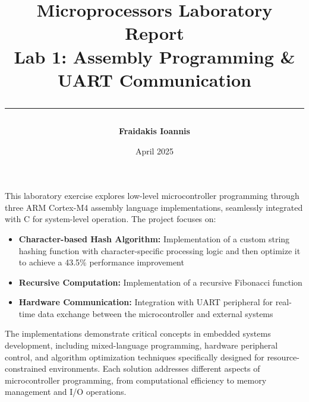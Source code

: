 \documentclass[a4paper,12pt]{article}
\title{
    \vspace*{2cm}
    \Huge\textbf{\textsf{Microprocessors Laboratory Report}}\\
    \vspace{0.4cm}
    \Large\textsf{Lab 1: Assembly Programming \& UART Communication}
    \vspace{1cm}
    \rule{\textwidth}{1pt}
}
\author{
    \Large\begin{tabular}{rl}
        \textbf{Fraidakis Ioannis}\\
    \end{tabular}
}
\date{\textsf{April 2025}}
\newenvironment{sectionbox}[1]{%
    \tcolorbox[
        colback=titleblue!5,
        colframe=titleblue!50,
        arc=3mm,
        title=#1,
        fonttitle=\bfseries\sffamily,
        before skip=1.2em,
        after skip=1.2em
    ]
}{\endtcolorbox}
\begin{document}
\maketitle

\vspace{0.5cm}

\begin{sectionbox}{Executive Summary}
This laboratory exercise explores low-level microcontroller programming through three ARM Cortex-M4 assembly language implementations, seamlessly integrated with C for system-level operation. The project focuses on:

\begin{itemize}[leftmargin=2em, itemsep=0.5em]
    \item \textbf{Character-based Hash Algorithm:} Implementation of a custom string hashing function with character-specific processing logic and then optimize it to achieve a 43.5\% performance improvement
    
    \item \textbf{Recursive Computation:} Implementation of a recursive Fibonacci function
        
    \item \textbf{Hardware Communication:} Integration with UART peripheral for real-time data exchange between the microcontroller and external systems
\end{itemize}

The implementations demonstrate critical concepts in embedded systems development, including mixed-language programming, hardware peripheral control, and algorithm optimization techniques specifically designed for resource-constrained environments. Each solution addresses different aspects of microcontroller programming, from computational efficiency to memory management and I/O operations.
\end{sectionbox}
\end{document}
